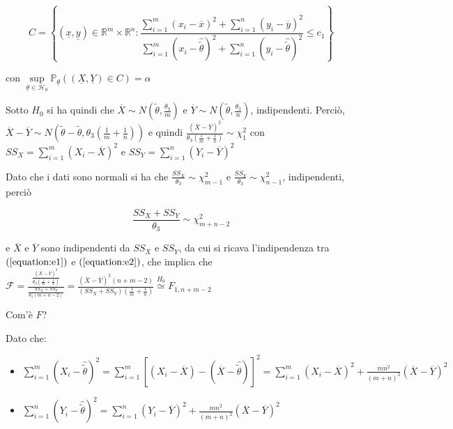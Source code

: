 \documentclass[hidelinks, 10pt]{report}
\begin{document}
\[
C = \left\{ (\underline{x}, \underline{y}) \in \mathbb{R}^{m} \times \mathbb{R}^{n} : \frac{\sum\limits_{i = 1}^{m} (x_{i} - \overline{x})^{2} + \sum\limits_{i = 1}^{n} (y_{i} - \overline{y})^{2}}{\sum\limits_{i = 1}^{m} (x_{i} - \hat{\tilde{\theta}})^{2} + \sum\limits_{i = 1}^{n} (y_{i} - \hat{\tilde{\theta}})^{2}} \le c_{1} \right\}
\]

con $ \sup\limits_{\underline{\theta} \in \mathcal{H}_{0}} \mathbb{P}_{\underline{\theta}} \left( (\underline{X}, \underline{Y}) \in C \right) = \alpha $

Sotto $ H_{0} $ si ha quindi che $ \overline{X} \sim N \left( \tilde{\theta}, \frac{\theta_{3}}{m} \right) $ e $ \overline{Y} \sim N \left( \tilde{\theta}, \frac{\theta_{3}}{n} \right) $, indipendenti. Perci\`o, $ \overline{X} - \overline{Y} \sim N \left( \tilde{\theta} - \tilde{\theta}, \theta_{3} \left( \frac{1}{m} + \frac{1}{n} \right) \right) $ e quindi $ \frac{(\overline{X} - \overline{Y})^{2}}{\theta_{3} \left( \frac{1}{m} + \frac{1}{n} \right)} \sim \chi^{2}_{1} $ con $ SS_{X} = \sum\limits_{i = 1}^{m} (X_{i} - \overline{X})^{2} $ e $ SS_{Y} = \sum\limits_{i = 1}^{n} (Y_{i} - \overline{Y})^{2} $

Dato che i dati sono normali si ha che $ \frac{SS_{X}}{\theta_{3}} \sim \chi^{2}_{m-1} $ e  $ \frac{SS_{Y}}{\theta_{3}} \sim \chi^{2}_{n - 1} $, indipendenti, perci\`o

\begin{equation}	\label{equation:e2}
\frac{SS_{X} + SS_{Y}}{\theta_{3}} \sim \chi^{2}_{m + n - 2}
\end{equation}

e $ \overline{X} $ e $ \overline{Y} $ sono indipendenti da $ SS_{X} $ e $ SS_{Y} $, da cui si ricava l'indipendenza tra $ (\ref{equation:e1}) $ e $ (\ref{equation:e2}) $, che implica che $ \mathcal{F} = \frac{\frac{(\overline{X}-\overline{Y})^{2}}{\theta_{3} \left( \frac{1}{m} + \frac{1}{n} \right)}}{\frac{SS_{X} + SS_{Y}}{\theta_{3} (m + n - 2)}} = \frac{(\overline{X} - \overline{Y})^{2} (n + m - 2)}{(SS_{X} + SS_{Y}) \left( \frac{1}{m} + \frac{1}{n} \right)} \stackrel{H_{0}}{\simeq} F_{1, n + m - 2} $

Com'\`e $ F $?

Dato che:
\begin{itemize}
\item $ \sum\limits_{i = 1}^{m} (X_{i} - \hat{\tilde{\theta}})^{2} = \sum\limits_{i = 1}^{m} [(X_{i} - \overline{X}) - (\overline{X} - \hat{\tilde{\theta}})]^{2} = \sum\limits_{i = 1}^{m} (X_{i} - \overline{X})^{2} + \frac{mn^2}{(m + n)^{2}} (\overline{X} - \overline{Y})^{2} $
\item $ \sum\limits_{i = 1}^{n} (Y_{i} - \hat{\tilde{\theta}})^{2} = \sum\limits_{i = 1}^{n} (Y_{i} - \overline{Y})^{2} + \frac{mn^2}{(m + n)^{2}} (\overline{X} - \overline{Y})^{2} $
\end{itemize}
\end{document}
